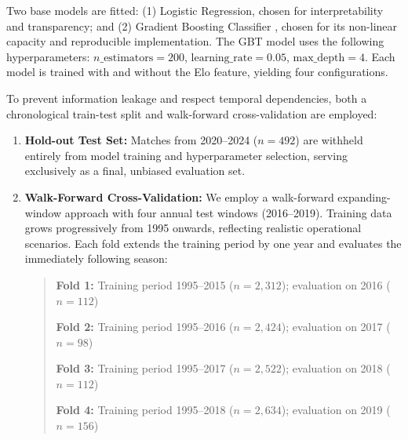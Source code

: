 \documentclass[12pt,a4paper,onecolumn]{article}
\begin{document}
Two base models are fitted: (1) Logistic Regression, chosen for interpretability and transparency; and (2) Gradient Boosting Classifier \cite{Friedman2001}, chosen for its non-linear capacity and reproducible implementation. The GBT model uses the following hyperparameters: 
$n\_\text{estimators}=200$, $\text{learning\_rate}=0.05$, 
$\text{max\_depth}=4$. Each model is trained with and without the Elo feature, yielding four configurations.

\vspace{0.25cm}

To prevent information leakage and respect temporal dependencies, both a chronological train-test split and walk-forward cross-validation are employed: \cite{Bergmeir2012}

\vspace{0.25cm}

\begin{enumerate}[label=\textbf{\arabic*.}, leftmargin=1.5cm, itemsep=0.5em, parsep=0.5em]

\item \textbf{Hold-out Test Set:} Matches from 2020--2024 ($n=492$) are withheld entirely from model training and hyperparameter selection, serving exclusively as a final, unbiased evaluation set.

\vspace{0.25cm}
\item \textbf{Walk-Forward Cross-Validation:} We employ a walk-forward expanding-window approach with four annual test windows (2016--2019). Training data grows progressively from 1995 onwards, reflecting realistic operational scenarios. Each fold extends the training period by one year and evaluates the immediately following season:

\begin{quote}
\small

\textbf{Fold 1:} Training period 1995--2015 ($n=2{,}312$); evaluation on 2016 ($n=112$)

\textbf{Fold 2:} Training period 1995--2016 ($n=2{,}424$); evaluation on 2017 ($n=98$)

\textbf{Fold 3:} Training period 1995--2017 ($n=2{,}522$); evaluation on 2018 ($n=112$)

\textbf{Fold 4:} Training period 1995--2018 ($n=2{,}634$); evaluation on 2019 ($n=156$)
\end{quote}
\end{enumerate}

\vspace{0.25cm}
\end{document}
